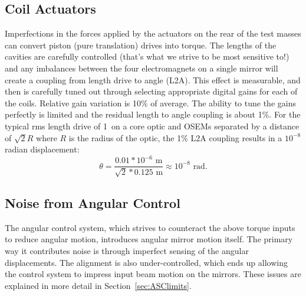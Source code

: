 



\subsection{Coil Actuators} 
\label{sec:L2A}
Imperfections in the forces applied by the actuators on the rear of the test masses can convert piston (pure translation) drives into torque. The lengths of the cavities are carefully controlled (that's what we strive to be most sensitive to!) and any imbalances between the four electromagnets on a single mirror will create a coupling from length drive to angle (L2A). This effect is measurable, and then is carefully tuned out through selecting appropriate digital gains for each of the coils. Relative gain variation is 10\% of average. The ability to tune the gains perfectly is limited and the residual length to angle coupling is about 1\%. For the typical rms length drive of 1~\micronspace on a core optic and OSEMs separated by a distance of $\sqrt{2} R$ where $R$ is the radius of the optic, the 1\% L2A coupling results in a $10^{-8}$ radian displacement: 
\begin{equation} 
\theta = \frac{0.01 * 10^{-6} \mbox{ m}}{\sqrt{2} * 0.125 \mbox{ m}} \approx 10^{-8} \mbox{ rad}.  
\end{equation}



\subsection{Noise from Angular Control}
The angular control system, which strives to counteract the above torque inputs to reduce angular motion, introduces angular mirror motion itself. The primary way it contributes noise is through imperfect sensing of the angular displacements. The alignment is also under-controlled, which ends up allowing the control system to impress input beam motion on the mirrors. These issues are explained in more detail in Section~\ref{sec:ASClimits}.


